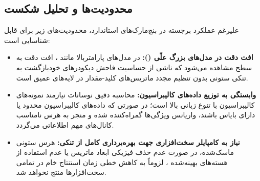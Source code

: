 \subsection{محدودیت‌ها و تحلیل شکست}
علیرغم عملکرد برجسته در بنچ‌مارک‌های استاندارد، محدودیت‌های زیر برای  قابل شناسایی است:
\begin{itemize}
    \item \textbf{افت دقت در مدل‌های بزرگ علّی ():} در مدل‌های پارامتربالا مانند ، افت دقت به سطح  مشاهده می‌شود که ناشی از حساسیت فاحش دیکودرهای خودبازگشت به تنکی ستونی بدون تنظیم مجدد ماتریس‌های کلید-مقدار در لایه‌های عمیق است.
    \item \textbf{وابستگی به توزیع داده‌های کالیبراسیون:} محاسبه دقیق نوسانات نیازمند نمونه‌های کالیبراسیون با تنوع زبانی بالا است؛ در صورتی که داده‌های کالیبراسیون محدود یا دارای بایاس باشند، واریانس ویژگی‌ها گمراه‌کننده شده و منجر به هرس نامناسب کانال‌های مهم اطلاعاتی می‌گردد.
    \item \textbf{نیاز به کامپایلر سخت‌افزاری جهت بهره‌برداری کامل از تنکی:} هرس ستونی ماسک‌شده، در صورت عدم حذف فیزیکی ابعاد ماتریس یا عدم استفاده از هسته‌های بهینه‌شده ، لزوماً به کاهش خطی زمان استنتاج خام در تمامی سخت‌افزارها منتج نخواهد شد.
\end{itemize}
